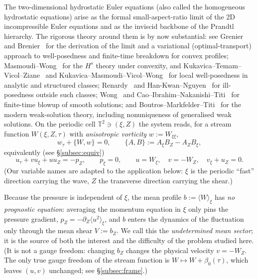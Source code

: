 \documentclass[11pt]{amsart}
\theoremstyle{definition}
\theoremstyle{remark}
\newcommand{\T}{\mathbb{T}}
\newcommand{\mean}[1]{\langle #1\rangle}
\begin{document}
The two-dimensional hydrostatic Euler equations (also called the
homogeneous hydrostatic equations) arise as the formal small-aspect-ratio
limit of the 2D incompressible Euler equations and as the inviscid
backbone of the Prandtl hierarchy. The rigorous theory around them is by
now substantial: see Grenier~\cite{Grenier1999} and
Brenier~\cite{Brenier1999} for the derivation of the limit and a
variational (optimal-transport) approach to well-posedness and
finite-time breakdown for convex profiles;
Masmoudi--Wong~\cite{MasmoudiWong2012} for the $H^s$ theory under
convexity, and Kukavica--Temam--Vicol--Ziane~\cite{KTVZ2011} and
Kukavica--Masmoudi--Vicol--Wong~\cite{KMVW2014} for local well-posedness
in analytic and structured classes; Renardy~\cite{Renardy2009} and
Han-Kwan--Nguyen~\cite{HKN2016} for ill-posedness outside such classes;
Wong~\cite{Wong2015} and Cao--Ibrahim--Nakanishi--Titi~\cite{CINT2015}
for finite-time blowup of smooth solutions; and
Boutros--Markfelder--Titi~\cite{BMT2024} for the modern weak-solution
theory, including nonuniqueness of generalised weak solutions. On the
periodic cell $\T^2\ni(\xi,Z)$ the system reads, for a stream function
$W(\xi,Z,\tau)$ with \emph{anisotropic vorticity} $w:=W_{\xi\xi}$,
\begin{equation}\label{eq:pde}
  w_\tau+\{W,w\}=0,\qquad \{A,B\}:=A_\xi B_Z-A_Z B_\xi,
\end{equation}
equivalently (see \S\ref{subsec:equiv})
\[
  u_\tau+v u_\xi+u u_Z=-p_Z,\qquad p_\xi=0,\qquad
  u=W_\xi,\quad v=-W_Z,\quad v_\xi+u_Z=0 .
\]
(Our variable names are adapted to the application below: $\xi$ is the
periodic ``fast'' direction carrying the wave, $Z$ the transverse
direction carrying the shear.)

Because the pressure is independent of $\xi$, the mean profile
$b:=\mean{W}_\xi$ has \emph{no prognostic equation}: averaging the
momentum equation in $\xi$ only pins the pressure gradient,
$p_Z=-\partial_Z\mean{u^2}_\xi$, and $b$ enters the dynamics of the
fluctuation only through the mean shear $V:=b_Z$. We call this the
\emph{undetermined mean sector}; it is the source of both the interest
and the difficulty of the problem studied here. (It is not a gauge
freedom: changing $b_Z$ changes the physical velocity $v=-W_Z$. The only
true gauge freedom of the stream function is $W\mapsto W+\beta_0(\tau)$,
which leaves $(u,v)$ unchanged; see \S\ref{subsec:frame}.)
\end{document}
